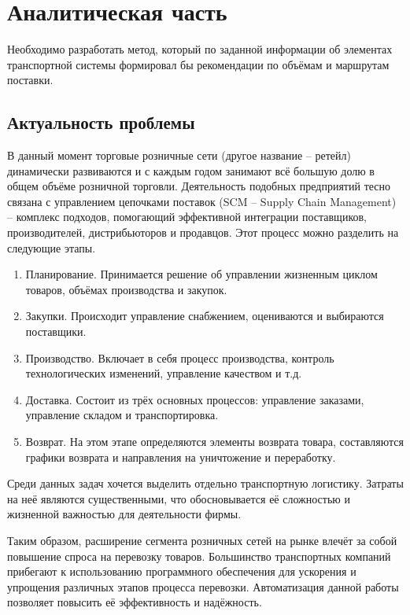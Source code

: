 \section{Аналитическая часть}
Необходимо разработать метод, который по заданной информации об элементах транспортной системы формировал бы рекомендации по объёмам и маршрутам поставки.

\subsection{Актуальность проблемы}
	В данный момент торговые розничные сети (другое название -- ретейл) динамически развиваются и с каждым годом занимают всё большую долю в общем объёме розничной торговли\cite{subj:demand}. Деятельность подобных предприятий тесно связана с управлением цепочками поставок (SCM -- Supply Chain Management) -- комплекс подходов, помогающий эффективной интеграции поставщиков, производителей, дистрибьюторов
	и продавцов. Этот процесс можно разделить на следующие этапы\cite{subj:scm}. 
	\begin{enumerate}
		\item Планирование. Принимается решение об управлении жизненным циклом товаров, объёмах производства и закупок.
		\item Закупки. Происходит управление снабжением, оцениваются и выбираются поставщики.
		\item Производство. Включает в себя процесс производства, контроль технологических изменений, управление качеством и т.д.
		\item Доставка. Состоит из трёх основных процессов: управление заказами, управление складом и транспортировка.
		\item Возврат. На этом этапе определяются элементы возврата товара, составляются графики возврата и направления на уничтожение и переработку.
	\end{enumerate}
	
	Среди данных задач хочется выделить отдельно транспортную логистику. Затраты на неё являются существенными, что обосновывается её сложностью и жизненной важностью для деятельности фирмы. 
	
	Таким образом, расширение сегмента розничных сетей на рынке влечёт за собой повышение спроса на перевозку товаров. Большинство транспортных компаний прибегают к использованию программного обеспечения для ускорения и упрощения различных этапов процесса перевозки\cite{subj:auto_eff}.  Автоматизация данной работы позволяет повысить её эффективность и надёжность.

